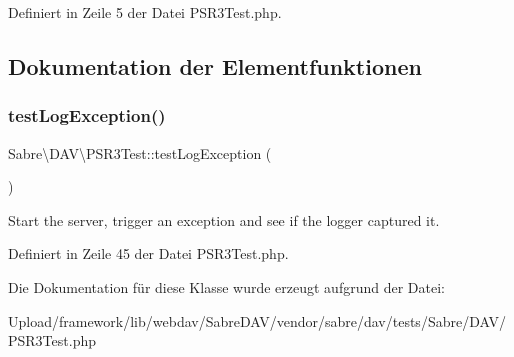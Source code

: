 Definiert in Zeile 5 der Datei P\+S\+R3\+Test.\+php.



\subsection{Dokumentation der Elementfunktionen}
\mbox{\label{class_sabre_1_1_d_a_v_1_1_p_s_r3_test_a1aa4dff7e1e27e0fb45b9cbaae65ac26}} 
\subsubsection{\texorpdfstring{test\+Log\+Exception()}{testLogException()}}
{\footnotesize\ttfamily Sabre\textbackslash{}\+D\+A\+V\textbackslash{}\+P\+S\+R3\+Test\+::test\+Log\+Exception (\begin{DoxyParamCaption}{ }\end{DoxyParamCaption})}

Start the server, trigger an exception and see if the logger captured it. 

Definiert in Zeile 45 der Datei P\+S\+R3\+Test.\+php.



Die Dokumentation für diese Klasse wurde erzeugt aufgrund der Datei\+:\begin{DoxyCompactItemize}
\item 
Upload/framework/lib/webdav/\+Sabre\+D\+A\+V/vendor/sabre/dav/tests/\+Sabre/\+D\+A\+V/P\+S\+R3\+Test.\+php\end{DoxyCompactItemize}
